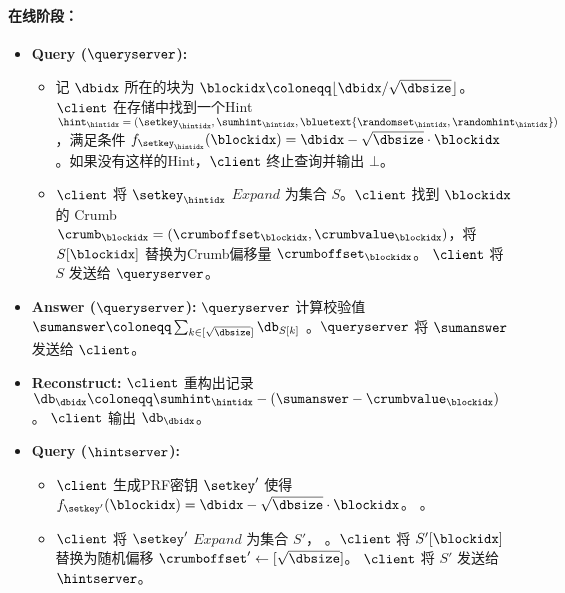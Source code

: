 \begin{mdframed}
        \paragraph{在线阶段：}
        \begin{itemize}
            \item \textbf{Query ($\queryserver$):}
                  \begin{itemize}
                      \item 记 $\dbidx$ 所在的块为 $\blockidx\coloneqq \lfloor \dbidx/\sqrt{\dbsize}\rfloor$。 $\client$ 在存储中找到一个Hint $\hint_\hintidx = (\setkey_\hintidx,\sumhint_\hintidx,\bluetext{\randomset_\hintidx,\randomhint_\hintidx})$，满足条件 $f_{\setkey_\hintidx}(\blockidx) = \dbidx-\sqrt{\dbsize}\cdot \blockidx$。如果没有这样的Hint，$\client$ 终止查询并输出 $\bot$。
                      \item $\client$ 将 $\setkey_\hintidx$ $Expand$ 为集合 $S$。$\client$ 找到 $\blockidx$ 的 Crumb $\crumb_\blockidx=(\crumboffset_\blockidx, \crumbvalue_\blockidx)$，将 $S[\blockidx]$ 替换为Crumb偏移量 $\crumboffset_\blockidx$。  $\client$ 将 $S$  发送给 $\queryserver$。
                  \end{itemize}
            \item \textbf{Answer ($\queryserver$):} $\queryserver$ 计算校验值 $\sumanswer\coloneqq \sum_{k\in [\sqrt{\dbsize}]}\db_{S[k]}$ 。$\queryserver$ 将 $\sumanswer$  发送给 $\client$。
            \item \textbf{Reconstruct:} $\client$ 重构出记录 $\db_\dbidx \coloneqq  \sumhint_\hintidx-(\sumanswer-\crumbvalue_\blockidx)$。  $\client$ 输出 $\db_\dbidx$。
            \item \textbf{Query ($\hintserver$):}
                  \begin{itemize}
                      \item $\client$ 生成PRF密钥 $\setkey'$ 使得 $f_{\setkey'}(\blockidx) = \dbidx-\sqrt{\dbsize}\cdot \blockidx$。 。
                      \item $\client$ 将 $\setkey'$ $Expand$ 为集合 $S'$， 。$\client$ 将 $S'[\blockidx]$ 替换为随机偏移 $\crumboffset' \leftarrow [\sqrt{\dbsize}]$。 $\client$ 将 $S'$ 发送给 $\hintserver$。

\end{itemize}
\end{itemize}
\end{mdframed}
